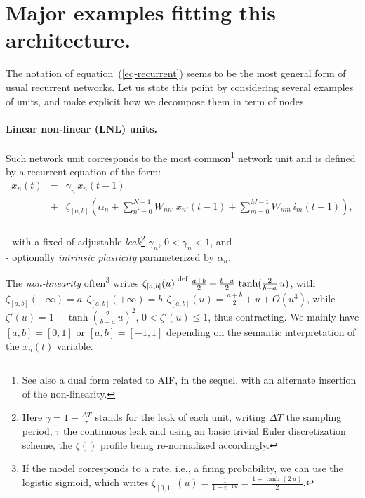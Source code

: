 \section{Major examples fitting this architecture.} \label{generality}

The notation of equation~(\ref{eq-recurrent}) seems to be the most general form of usual recurrent networks. Let us state this point by considering several examples of units, and make explicit how we decompose them in term of nodes.

\paragraph{Linear non-linear (LNL) units.} 

Such network unit corresponds to the most common\footnote{See also a dual form related to AIF, in the sequel, with an alternate insertion of the non-linearity.} network unit and is defined by a recurrent equation of the form:
\begin{equation}\label{lnl-network}
\begin{array}{rcl}x_n(t) &=& \gamma_n \, x_n(t-1) \\ &+& \zeta_{[a,b]}\left(\alpha_n + \sum_{n' = 0}^{N-1} W_{nn'} \, x_{n'}(t-1) + \sum_{m = 0}^{M-1} W_{nm} \, i_m(t-1)\right), \end{array}\end{equation}
\\- with a fixed of adjustable {\em leak}\footnote{Here $\gamma = 1 - \frac{\Delta T}{\tau}$ stands for the leak of each unit, writing $\Delta T$ the sampling period, $\tau$ the continuous leak and using an basic trivial Euler discretization scheme, the $\zeta()$ profile being re-normalized accordingly.} $\gamma_n$, $0 < \gamma_n < 1$, and 
\\- optionally {\em intrinsic plasticity} parameterized by $\alpha_n$. 

The {\em non-linearity} often\footnote{If the model corresponds to a rate, i.e., a firing probability, we can use the logistic sigmoid, which writes $\zeta_{[0,1]}(u) = \frac{1}{1 + e^{-4 \, u}} = \frac{1 + \tanh(2 \, u)}{2}$.} writes $\zeta_{[a,b]}(u) \stackrel {\rm def}{=} \frac{a+b}{2} + \frac{b-a}{2} \, \tanh(\frac{2}{b-a} \, u)$, with $\zeta_{[a,b]}(-\infty) = a, \zeta_{[a,b]}(+\infty) = b, \zeta_{[a,b]}(u) = \frac{a+b}{2} + u + O(u^3)$,  while $\zeta'(u) = 1 - \tanh(\frac{2}{b-a} \, u)^2$,  $0 < \zeta'(u) \leq 1$, thus contracting. We mainly have $[a,b] = [0,1]$ or $[a,b] = [-1,1]$ depending on the semantic interpretation of the $x_n(t)$ variable.

